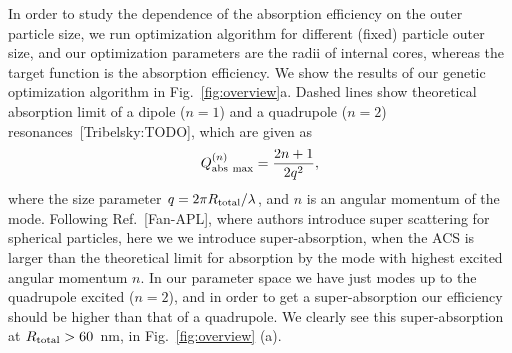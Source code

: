 \documentclass[aps,prl,twocolumn,showpacs,superscriptaddress,groupedaddress]{revtex4-1}
\begin{document}
\begin{figure}
\end{figure}
%
In order to study the dependence of the absorption efficiency on the
outer particle size, we run optimization algorithm for different
(fixed) particle outer size, and our optimization parameters are the
radii of internal cores, whereas the target function is the absorption
efficiency.  We show the results of our genetic optimization algorithm
in Fig.~\ref{fig:overview}a.  Dashed lines show theoretical absorption
limit of a dipole ($n=1$) and a quadrupole ($n=2$)
resonances~[Tribelsky:TODO], which are given as $$Q^{(n)}_{\rm abs\
  max}=\frac{2n+1}{2q^2},$$ where the size parameter $q=2\pi R_{\rm
  total}/\lambda$, and $n$ is an angular momentum of the
mode. Following Ref.~[Fan-APL], where authors introduce super
scattering for spherical particles, here we we introduce
super-absorption, when the ACS is larger than the theoretical limit
for absorption by the mode with highest excited angular momentum
$n$. In our parameter space we have just modes up to the quadrupole
excited ($n=2$), and in order to get a super-absorption our efficiency
should be higher than that of a quadrupole. We clearly see this
super-absorption at $R_{\rm total}>60$~nm, in Fig.~\ref{fig:overview}
(a).
\end{document}

